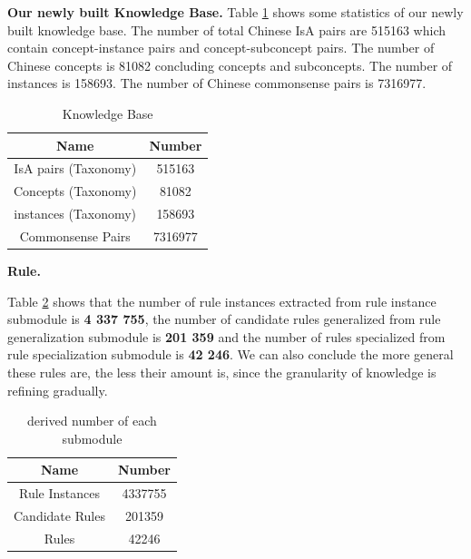 \textbf{Our newly built Knowledge Base.}
Table \ref{tab:knowledge_base_statistics} shows some statistics of our newly built knowledge base. The number of total Chinese IsA pairs are 515163 which contain concept-instance pairs and concept-subconcept pairs. The number of Chinese concepts is 81082 concluding concepts and subconcepts. The number of instances is 158693. The number of Chinese commonsense pairs is 7316977.

\begin{table}[htbp]
	\caption{Knowledge Base}
	\begin{center}
		\begin{tabular}{|c|c|}
			\hline
			\textbf{Name}&\textbf{Number}\\
			\hline
			IsA pairs (Taxonomy)&515163\\
			\hline
			Concepts (Taxonomy)&81082\\
			\hline
			instances (Taxonomy)&158693\\
			\hline
			Commonsense Pairs&7316977\\
			\hline
		\end{tabular}
		\label{tab:knowledge_base_statistics}
	\end{center}
\end{table}	

\textbf{Rule.}

Table \ref{tab:rule_statistics} shows that
the number of rule instances extracted from rule instance submodule is \textbf{4 337 755},
the number of candidate rules generalized from rule generalization submodule is \textbf{201 359} and the number of rules specialized from rule specialization submodule is \textbf{42 246}.
We can also conclude the more general these rules are, the less their amount is, since the granularity of knowledge is refining gradually. 

\begin{table}[htbp]
	\caption{derived number of each submodule}
	\begin{center}
		\begin{tabular}{|c|c|}
			\hline
			\textbf{Name} & \textbf{Number}\\
			\hline
			Rule Instances &4337755\\
			\hline
			Candidate Rules &201359\\
			\hline
			Rules &42246\\
			\hline
		\end{tabular}
		\label{tab:rule_statistics}
	\end{center}
\end{table}	

